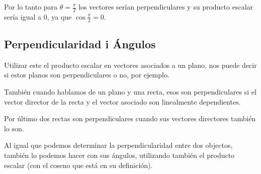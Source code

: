 \documentclass[arial,a4paper,print]{article}
\begin{document}
Por lo tanto para $\theta = \frac{\pi}{2}$ los vectores serían perpendiculares y su producto escalar sería igual a $0$, ya que $\cos\frac{\pi}{2} = 0$.

\subsection{Perpendicularidad i Ángulos}

Utilizar este el producto escalar en vectores asociados a un plano, nos puede decir si estos planos son perpendiculares o no, por ejemplo. 

También cuando hablamos de un plano y una recta, esos son perpendiculares si el vector director de la recta y el vector asociado son linealmente dependientes. 

Por último dos rectas son perpendiculares cuando sus vectores directores también lo son. 

Al igual que podemos determinar la perpendicularidad entre dos objectos, también lo podemos hacer con sus ángulos, utilizando también el producto escalar (con el coseno que está en su definición). 
\end{document}
